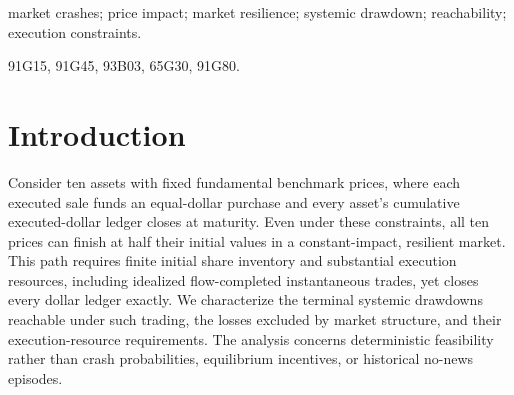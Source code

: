 \documentclass[review,hidelinks,onefignum,onetabnum]{siamonline250211}
\begin{document}
\raggedbottom
\maketitle
\begin{abstract}
Dollar-neutral trading need not be price-neutral. We study this distinction
in a deterministic multiasset market with fixed fundamentals, state-dependent
price impact, paired-dollar transfers, price-level resilience, and zero
terminal net executed dollars for each asset. A response-adapted price
coordinate exposes the mechanism: paired trades preserve its sum, while
resilience generally moves the system between the corresponding invariant
surfaces. Terminal price displacements can therefore survive closed dollar
ledgers, at a cost in share inventory. The resulting geometry yields global
elasticity barriers, constructive reachability results, and execution-resource
bounds. In an idealized ten-asset constant-impact witness, every asset
finishes at half its fundamental price, with finite turnover and inventory
but flow-completed instantaneous trades. Separately, an interval-certified
finite-rate ten-asset witness under rolling price limits has seven assets
falling more than 20.2 percent and an equal-weight geometric index falling
more than 6 percent, with paired-dollar turnover below five. Arbitrarily
severe partial-coverage losses remain constructively reachable with uniform
finite resources for each fixed sublinear impact exponent, whereas full
coverage faces an unattained horizon-dependent ceiling. These results distinguish structural impact barriers from
the execution resources needed to realize systemic drawdowns.
\end{abstract}

\begin{keywords}market crashes; price impact; market resilience; systemic drawdown; reachability; execution constraints.\end{keywords}
\begin{MSCcodes}91G15, 91G45, 93B03, 65G30, 91G80.\end{MSCcodes}

\section{Introduction}\label{sec:intro}
Consider ten assets with fixed fundamental benchmark prices, where
each executed sale funds an equal-dollar purchase and every asset's
cumulative executed-dollar ledger closes at maturity. Even under these
constraints, all ten prices can finish at half their initial values in
a constant-impact, resilient market. This path requires finite initial
share inventory and substantial execution resources, including idealized
flow-completed instantaneous trades, yet closes every dollar ledger
exactly. We characterize the terminal systemic drawdowns reachable under
such trading, the losses excluded by market structure, and their
execution-resource requirements. The analysis concerns deterministic
feasibility rather than crash probabilities, equilibrium incentives, or
historical no-news episodes.
\end{document}
